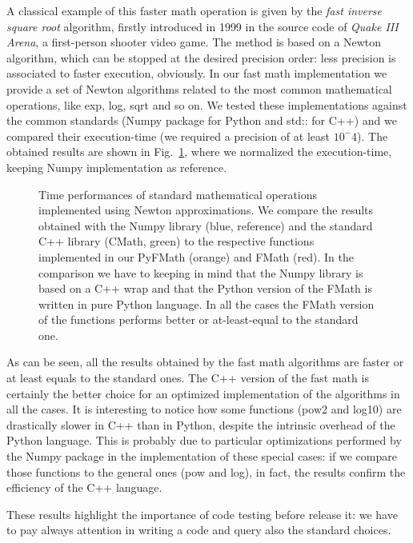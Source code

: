 \documentclass{standalone}
\begin{document}
A classical example of this faster math operation is given by the \emph{fast inverse square root} algorithm, firstly introduced in 1999 in the source code of \emph{Quake III Arena}, a first-person shooter video game.
The method is based on a Newton algorithm, which can be stopped at the desired precision order: less precision is associated to faster execution, obviously.
In our \textsf{fast math} implementation we provide a set of Newton algorithms related to the most common mathematical operations, like \textsf{exp}, \textsf{log}, \textsf{sqrt} and so on.
We tested these implementations against the common standards (\textsf{Numpy} package for \textsf{Python} and \textsf{std::} for \textsf{C++}) and we compared their execution-time (we required a precision of at least $10^-4$).
The obtained results are shown in Fig.~\ref{fig:fmath}, where we normalized the execution-time, keeping \textsf{Numpy} implementation as reference.

\begin{figure}[htbp]
\centering
\def\svgwidth{0.8\textwidth}

\caption{Time performances of standard mathematical operations implemented using Newton approximations.
We compare the results obtained with the \textsf{Numpy} library (blue, reference) and the standard \textsf{C++} library (\textsf{CMath}, green) to the respective functions implemented in our \textsf{PyFMath} (orange) and \textsf{FMath} (red).
In the comparison we have to keeping in mind that the \textsf{Numpy} library is based on a \textsf{C++} wrap and that the \textsf{Python} version of the \textsf{FMath} is written in pure \textsf{Python} language.
In all the cases the \textsf{FMath} version of the functions performs better or at-least-equal to the standard one.
}
\label{fig:fmath}
\end{figure}

As can be seen, all the results obtained by the \textsf{fast math} algorithms are faster or at least equals to the standard ones.
The \textsf{C++} version of the \textsf{fast math} is certainly the better choice for an optimized implementation of the algorithms in all the cases.
It is interesting to notice how some functions (\textsf{pow2} and \textsf{log10}) are drastically slower in \textsf{C++} than in \textsf{Python}, despite the intrinsic overhead of the \textsf{Python} language.
This is probably due to particular optimizations performed by the \textsf{Numpy} package in the implementation of these special cases: if we compare those functions to the general ones (\textsf{pow} and \textsf{log}), in fact, the results confirm the efficiency of the \textsf{C++} language.

These results highlight the importance of code testing before release it: we have to pay always attention in writing a code and query also the standard choices.
\end{document}
